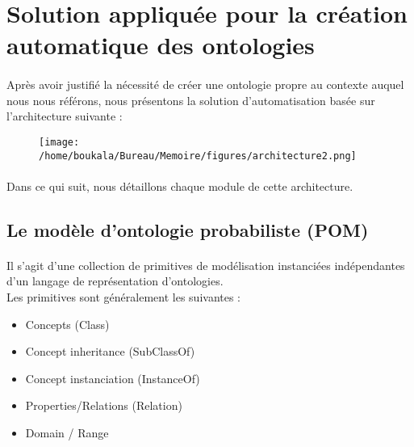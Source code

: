 \documentclass[12pt, a4paper, oneside]{book}
\begin{document}
\section{Solution appliquée pour la création automatique des ontologies}
\paragraph{}
Après avoir justifié la nécessité de créer une ontologie propre au contexte auquel nous nous référons, nous présentons la solution d'automatisation basée sur l'architecture suivante \citep{archi3} : 

\begin{figure}[h!]
\begin{center}
\texttt{[image: /home/boukala/Bureau/Memoire/figures/architecture2.png]}
\end{center}
\end{figure}



 
\paragraph{}
Dans ce qui suit, nous détaillons chaque module de cette architecture.

\subsection{Le modèle d'ontologie probabiliste (POM)}

\paragraph{}
Il s'agit d'une collection de primitives de modélisation instanciées indépendantes d'un langage de représentation d'ontologies.\citep{pom} \\
Les primitives sont généralement les suivantes : \\ 
\begin{itemize}

\item Concepts (Class)\\
\item Concept inheritance (SubClassOf)\\
\item Concept instanciation (InstanceOf)\\
\item Properties/Relations (Relation)\\
\item Domain / Range\\

\end{itemize}
\end{document}
